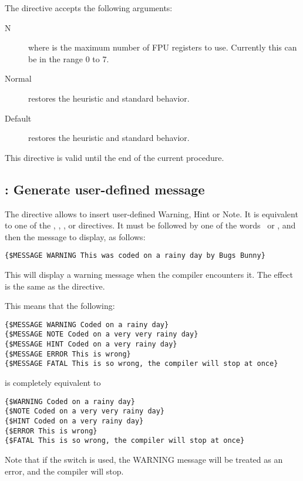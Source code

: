 The directive accepts the following arguments:

\begin{description}
\item [N] where  is the maximum number of FPU registers to use.
Currently this can be in the range 0 to 7.
\item[Normal] restores the heuristic and standard behavior.
\item[Default] restores the heuristic and standard behavior.
\end{description}

\begin{remark}This directive is valid until the end of the current procedure.
\end{remark}

\subsection{ : Generate user-defined message}
The  directive allows to insert user-defined Warning, Hint or Note. 
It is equivalent to one of the , , ,  or  
directives. It must be followed by one of the words  \,  or
, and then the message to display, as follows:

\begin{verbatim}
{$MESSAGE WARNING This was coded on a rainy day by Bugs Bunny}
\end{verbatim}
This will display a warning message when the compiler encounters it. 
The effect is the same as the  directive.

This means that the following:
\begin{verbatim}
{$MESSAGE WARNING Coded on a rainy day}
{$MESSAGE NOTE Coded on a very very rainy day}
{$MESSAGE HINT Coded on a very rainy day}
{$MESSAGE ERROR This is wrong}
{$MESSAGE FATAL This is so wrong, the compiler will stop at once}
\end{verbatim}
is completely equivalent to
\begin{verbatim}
{$WARNING Coded on a rainy day}
{$NOTE Coded on a very very rainy day}
{$HINT Coded on a very rainy day}
{$ERROR This is wrong}
{$FATAL This is so wrong, the compiler will stop at once}
\end{verbatim}

Note that if the  switch is used, the WARNING message will be
treated as an error, and the compiler will stop.


